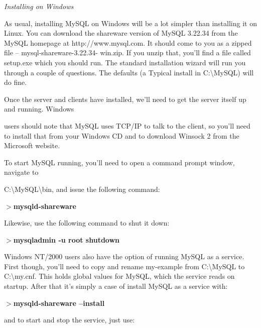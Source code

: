 \documentclass[a4paper,11pt]{book}
\begin{document}
\noindent 

\noindent 

\noindent \textit{Installing on Windows}

\noindent As usual, installing MySQL on Windows will be a lot simpler than installing it on Linux. You can download the shareware version of MySQL 3.22.34 from the MySQL homepage at http://www.mysql.com. It should come to you as a zipped file -- mysql-shareware-3.22.34- win.zip. If you unzip that, you'll find a file called setup.exe which you should run. The standard installation wizard will run you through a couple of questions. The defaults (a Typical install in C:\textbackslash MySQL) will do fine.

\noindent 

\noindent Once the server and clients have installed, we'll need to get the server itself up and running. Windows

 users should note that MySQL uses TCP/IP to talk to the client, so you'll need to install that from your Windows CD and to download Winsock 2 from the Microsoft website.

\noindent 

\noindent To start MySQL running, you'll need to open a command prompt window, navigate to

\noindent C:\textbackslash MySQL\textbackslash bin, and issue the following command:

\noindent 

\noindent $>$\textbf{mysqld-shareware}

\noindent 

\noindent Likewise, use the following command to shut it down:

\noindent 

\noindent $>$\textbf{mysqladmin -u root shutdown}

\noindent 

\noindent Windows  NT/2000 users also  have  the  option  of running  MySQL  as  a  service.  First  though,  you'll need to  copy and  rename my-example from  C:\textbackslash MySQL to  C:\textbackslash my.cnf.  This  holds  global  values for MySQL,  which the  service  reads  on startup.  After  that  it's  simply  a  case  of  install  MySQL  as a service with:

\noindent 

\noindent $>$\textbf{mysqld-shareware --install}

\noindent 

\noindent and to start and stop the service, just use:
\end{document}
